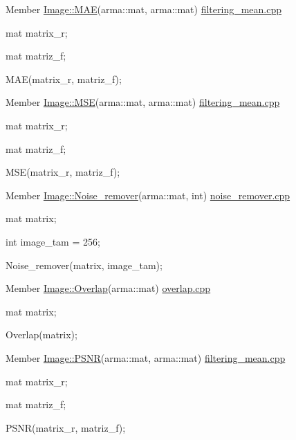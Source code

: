 \begin{DoxyDescription}
\item[Member \hyperlink{classImage_ac2bfdd46c739cf12e1a9c19635ee1acc}{Image::MAE}(arma::mat, arma::mat) ]\hyperlink{filtering__mean_8cpp}{filtering\_\-mean.cpp} \par
 mat matrix\_\-r; \par
 mat matriz\_\-f; \par
 MAE(matrix\_\-r, matriz\_\-f); 
\end{DoxyDescription}

\label{test__test000018}
\hypertarget{test__test000018}{}
 
\begin{DoxyDescription}
\item[Member \hyperlink{classImage_a724ca0afc83c93fa43bccd1802c6bd81}{Image::MSE}(arma::mat, arma::mat) ]\hyperlink{filtering__mean_8cpp}{filtering\_\-mean.cpp} \par
 mat matrix\_\-r; \par
 mat matriz\_\-f; \par
 MSE(matrix\_\-r, matriz\_\-f); 
\end{DoxyDescription}

\label{test__test000015}
\hypertarget{test__test000015}{}
 
\begin{DoxyDescription}
\item[Member \hyperlink{classImage_ae20915262dc4e5f323ab1ee1144e8360}{Image::Noise\_\-remover}(arma::mat, int) ]\hyperlink{noise__remover_8cpp}{noise\_\-remover.cpp} \par
 mat matrix; \par
 int image\_\-tam = 256; \par
 Noise\_\-remover(matrix, image\_\-tam); 
\end{DoxyDescription}

\label{test__test000016}
\hypertarget{test__test000016}{}
 
\begin{DoxyDescription}
\item[Member \hyperlink{classImage_a8c565bce437181ecac5b042055c23919}{Image::Overlap}(arma::mat) ]\hyperlink{overlap_8cpp}{overlap.cpp} \par
 mat matrix; \par
 Overlap(matrix); 
\end{DoxyDescription}

\label{test__test000017}
\hypertarget{test__test000017}{}
 
\begin{DoxyDescription}
\item[Member \hyperlink{classImage_a0a7f491ee408027a11cc0551fb4dedbd}{Image::PSNR}(arma::mat, arma::mat) ]\hyperlink{filtering__mean_8cpp}{filtering\_\-mean.cpp} \par
 mat matrix\_\-r; \par
 mat matriz\_\-f; \par
 PSNR(matrix\_\-r, matriz\_\-f); 
\end{DoxyDescription}

